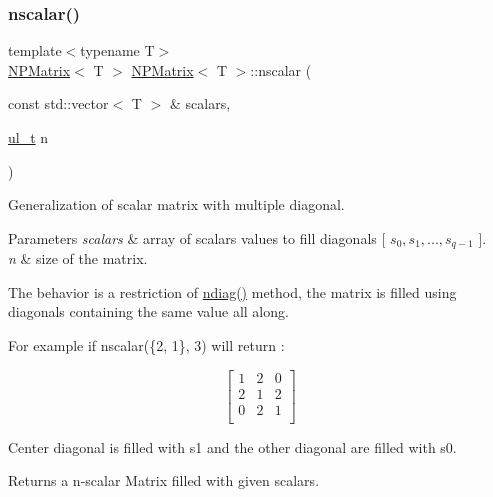\subsubsection{\texorpdfstring{nscalar()}{nscalar()}}
{\footnotesize\ttfamily template$<$typename T$>$ \\
\mbox{\hyperlink{class_n_p_matrix}{N\+P\+Matrix}}$<$ T $>$ \mbox{\hyperlink{class_n_p_matrix}{N\+P\+Matrix}}$<$ T $>$\+::nscalar (\begin{DoxyParamCaption}\item[{const std\+::vector$<$ T $>$ \&}]{scalars,  }\item[{\mbox{\hyperlink{typedef_8h_a1b140a2034db3f5dfe18a987745df43a}{ul\+\_\+t}}}]{n }\end{DoxyParamCaption})\hspace{0.3cm}{\ttfamily [static]}}



Generalization of scalar matrix with multiple diagonal. 


\begin{DoxyParams}{Parameters}
{\em scalars} & array of scalars values to fill diagonals {\ttfamily \mbox{[}} $ s_0, s_1, ..., s_{q-1} $ {\ttfamily \mbox{]}}. \\
\hline
{\em n} & size of the matrix.\\
\hline
\end{DoxyParams}
The behavior is a restriction of {\ttfamily \mbox{\hyperlink{class_n_p_matrix_a16aa6a18c33005300049ab1a39cbfbc2}{ndiag()}}} method, the matrix is filled using diagonals containing the same value all along.

For example if {\ttfamily nscalar(\{2, 1\}, 3)} will return \+:

\[ \begin{bmatrix} 1 & 2 & 0 \\ 2 & 1 & 2 \\ 0 & 2 & 1 \\ \end{bmatrix} \]

Center diagonal is filled with s1 and the other diagonal are filled with s0. \begin{DoxyReturn}{Returns}
a n-\/scalar Matrix filled with given {\ttfamily scalars}. 
\end{DoxyReturn}
\mbox{\label{class_n_p_matrix_aafbf2155265a070f3ae418828e40359e}} 
